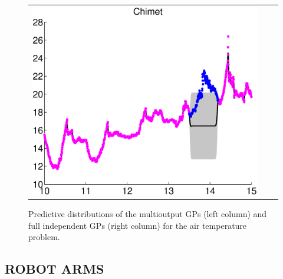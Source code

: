 \begin{figure}
\begin{tabular}{ccc}
\includegraphics[scale=0.3]{figures/weatherChimet.eps}
\end{tabular}
\caption{Predictive distributions of the multioutput GPs (left column) and full independent GPs (right column) for the air temperature problem.}
\label{fig:weather}
\end{figure}

\subsection{ROBOT ARMS}
